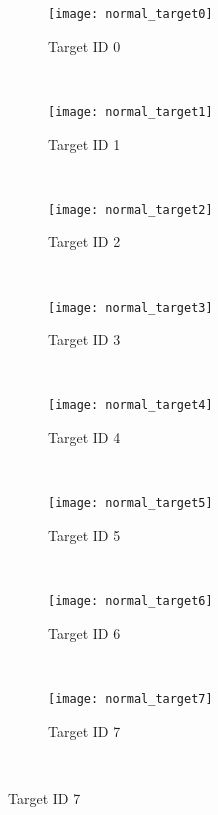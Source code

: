 \begin{figure}[!ht]
	\centering
	\begin{subfigure}[b]{0.23\textwidth}
		\centering
		\texttt{[image: normal\_target0]}
	    \caption{Target ID 0}
	\end{subfigure}
	~ %
    \begin{subfigure}[b]{0.23\textwidth}
		\centering
		\texttt{[image: normal\_target1]}
		\caption{Target ID 1}	
	\end{subfigure}
    ~ %
    \begin{subfigure}[b]{0.23\textwidth}
		\centering
		\texttt{[image: normal\_target2]}	
		\caption{Target ID 2}
	\end{subfigure}
	~ %
    \begin{subfigure}[b]{0.23\textwidth}
		\centering
		\texttt{[image: normal\_target3]}	
		\caption{Target ID 3}
	\end{subfigure} \\[2ex]
    
    
    \begin{subfigure}[b]{0.23\textwidth}
		\centering
		\texttt{[image: normal\_target4]}	
		\caption{Target ID 4}
	\end{subfigure}
    ~ %
    \begin{subfigure}[b]{0.23\textwidth}
		\centering
		\texttt{[image: normal\_target5]}	
		\caption{Target ID 5}
	\end{subfigure}
    ~ %
    \begin{subfigure}[b]{0.23\textwidth}
		\centering
		\texttt{[image: normal\_target6]}	
		\caption{Target ID 6}
	\end{subfigure}
	~ %
    \begin{subfigure}[b]{0.23\textwidth}
		\centering
		\texttt{[image: normal\_target7]}	
		\caption{Target ID 7}
	\end{subfigure}  \\[2ex]
	

\end{figure}
